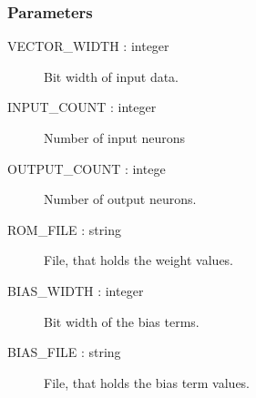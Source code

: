 \subsubsection{Parameters}
\begin{description}
	\item [VECTOR\_WIDTH   : integer] Bit width of input data.
	\item [INPUT\_COUNT    : integer] Number of input neurons
	\item [OUTPUT\_COUNT   : intege] Number of output neurons.
	\item [ROM\_FILE       : string] File, that holds the weight values.
	\item [BIAS\_WIDTH     : integer] Bit width of the bias terms.
	\item [BIAS\_FILE      : string] File, that holds the bias term values.
\end{description}


